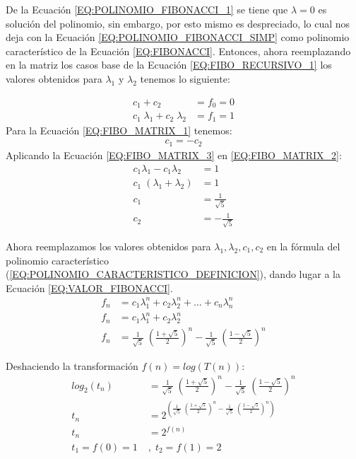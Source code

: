 \documentclass[11pt]{utalcaDoc}
\numberwithin{equation}{section}
\begin{document}
De la Ecuación \ref{EQ:POLINOMIO_FIBONACCI_1} se tiene que $\lambda=0$ es solución del polinomio, sin embargo, por esto mismo es despreciado, lo cual nos deja con la Ecuación \ref{EQ:POLINOMIO_FIBONACCI_SIMP} como polinomio característico de la Ecuación \ref{EQ:FIBONACCI}. Entonces, ahora reemplazando en la matriz los casos base de la Ecuación \ref{EQ:FIBO_RECURSIVO_1} los valores obtenidos para $\lambda_1$ y $\lambda_2$ tenemos lo siguiente:

 
\begin{align}
	c_1 + c_2 &= f_0 = 0 \label{EQ:FIBO_MATRIX_1} \\
	c_1\;\lambda_{1} + c_2\;\lambda_{2} &= f_1 = 1 \label{EQ:FIBO_MATRIX_2}
\end{align}
Para la Ecuación \ref{EQ:FIBO_MATRIX_1} tenemos:
\begin{align}
	c_1 = -c_2 \label{EQ:FIBO_MATRIX_3}
\end{align}
Aplicando la Ecuación \ref{EQ:FIBO_MATRIX_3} en \ref{EQ:FIBO_MATRIX_2}:
\begin{align}
	c_1\lambda_1 - c_1\lambda_2&=1 \nonumber\\
	c_1\;(\lambda_1 +\lambda_2) &= 1\nonumber\\
	c_1 &= \frac{1}{\sqrt{5}} \nonumber\\
	c_2 &= -\frac{1}{\sqrt{5}} \nonumber
\end{align}

Ahora reemplazamos los valores obtenidos para $\lambda_1, \lambda_2, c_1, c_2$ en la fórmula del polinomio característico (\ref{EQ:POLINOMIO_CARACTERISTICO_DEFINICION}), dando lugar a la Ecuación \ref{EQ:VALOR_FIBONACCI}.
\begin{align}
	f_n &= c_1 \lambda_{1}^{n} + c_2 \lambda_{2}^{n} + \ldots + c_n \lambda_{n}^{n}\ \label{EQ:POLINOMIO_CARACTERISTICO_DEFINICION}\\	
	f_n &= c_1 \lambda_{1}^{n} + c_2 \lambda_{2}^{n}\nonumber\\	
	f_n &= \frac{1}{\sqrt{5}}\;\left(\frac{1+\sqrt{5}}{2}\right)^n -\frac{1}{\sqrt{5}}\;\left(\frac{1-\sqrt{5}}{2}\right)^n \label{EQ:VALOR_FIBONACCI}
\end{align}

Deshaciendo la transformación $f(n) = log(T(n))$:
\begin{align}
log_2(t_n)&= \frac{1}{\sqrt{5}}\;\left(\frac{1+\sqrt{5}}{2}\right)^n -\frac{1}{\sqrt{5}}\;\left(\frac{1-\sqrt{5}}{2}\right)^n \nonumber\\
t_n &= 2^{\left(\frac{1}{\sqrt{5}}\;\left(\frac{1+\sqrt{5}}{2}\right)^n -\frac{1}{\sqrt{5}}\;\left(\frac{1-\sqrt{5}}{2}\right)^n\right)}\nonumber\\
t_n&=2^{f(n)} \\
t_1 = f(0) = 1 \;&,\; t_2 = f(1) = 2
\end{align}
\end{document}
